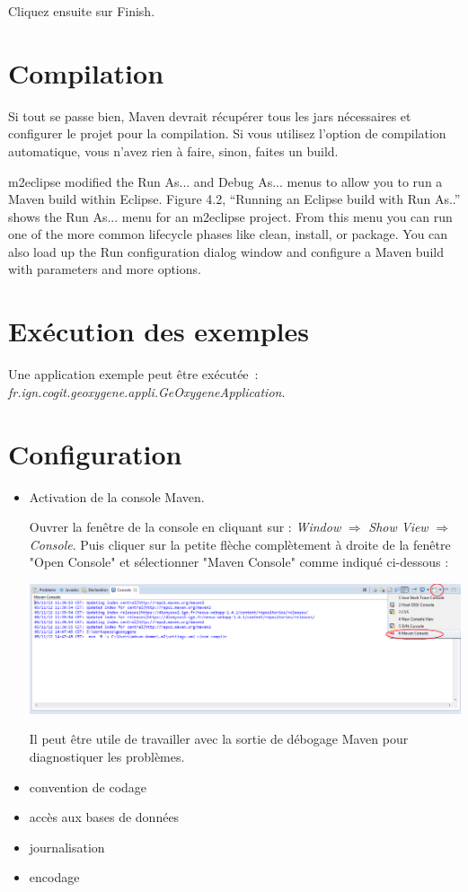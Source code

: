 \bigskip

\noindent
Cliquez ensuite sur Finish.


\section{Compilation}

Si tout se passe bien, Maven devrait récupérer tous les jars nécessaires et configurer le projet pour la compilation. Si vous utilisez l'option de compilation automatique, vous n'avez rien à faire, sinon, faites un build.

m2eclipse modified the Run As... and Debug As... menus to allow you to run a Maven build within Eclipse. Figure 4.2, “Running
an Eclipse build with Run As..” shows the Run As... menu for an m2eclipse project. From this menu you can run one of the more
common lifecycle phases like clean, install, or package. You can also load up the Run configuration dialog window and configure
a Maven build with parameters and more options.




\section{Exécution des exemples}
Une application exemple peut \^etre exécutée~: \emph{fr.ign.cogit.geoxygene.appli.GeOxygeneApplication}.


\section{Configuration}

\begin{itemize}[leftmargin=* ,parsep=0cm,itemsep=0cm,topsep=0cm]
\item Activation de la console Maven.

Ouvrer la fenêtre de la console en cliquant sur : {\emph{Window} $\Rightarrow$ \emph{Show View}  $\Rightarrow$ \emph{Console}}. Puis cliquer sur la petite flèche complètement à droite de la fenêtre "Open Console" et sélectionner "Maven Console" comme indiqué ci-dessous :

\begin{center}
\includegraphics[width=0.5\linewidth]{../../resources/images/guide_installation/geoxygeneEtape5.png}
\end{center}

Il peut être utile de travailler avec la sortie de débogage Maven pour diagnostiquer les problèmes.


\end{itemize}


\begin{itemize}[leftmargin=* ,parsep=0cm,itemsep=0cm,topsep=0cm]
\item convention de codage
\item accès aux bases de données
\item journalisation
\item encodage
\end{itemize}
